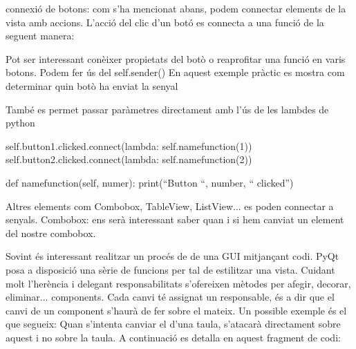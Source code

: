 \documentclass[letterpaper,11pt,catalan]{sphinxmanual}
\begin{document}
connexió de botons: com s'ha mencionat abans, podem connectar elements de la vista amb accions. L'acció del clic d'un botó es connecta a una funció de la seguent manera:

\begin{sphinxVerbatim}[commandchars=\\\{\}]
\end{sphinxVerbatim}

Pot ser interessant conèixer propietats del botò o reaprofitar una funció en varis botons.
Podem fer ús del self.sender()
En aquest exemple pràctic es mostra com determinar quin botò ha enviat la senyal

\begin{sphinxVerbatim}[commandchars=\\\{\}]

 
\end{sphinxVerbatim}

També es permet passar paràmetres directament amb l'ús de les lambdes de python

\begin{sphinxVerbatim}[commandchars=\\\{\}]
self.button\PYGZus{}1.clicked.connect(lambda: self.name\PYGZus{}function(1))
self.button\PYGZus{}2.clicked.connect(lambda: self.name\PYGZus{}function(2))

def name\PYGZus{}function(self, numer):
    print(“Button “, number, “ clicked”)
\end{sphinxVerbatim}

Altres elements com Combobox, TableView, ListView... es poden connectar a senyals.
Combobox: ens serà interessant saber quan i si hem canviat un element del nostre combobox.

Sovint és interessant realitzar un procés de  de una GUI mitjançant codi. PyQt posa a disposició una sèrie de funcions per tal de estilitzar una vista. Cuidant molt l’herència i delegant responsabilitats s’ofereixen mètodes per afegir, decorar, eliminar... components.
Cada canvi té assignat un responsable, és a dir que el canvi de un component s’haurà de fer sobre el mateix. Un possible exemple és el que segueix: Quan s’intenta canviar
el  d’una taula, s’atacarà directament sobre aquest  i no sobre la taula. A continuació es detalla en aquest fragment de codi:
\end{document}
